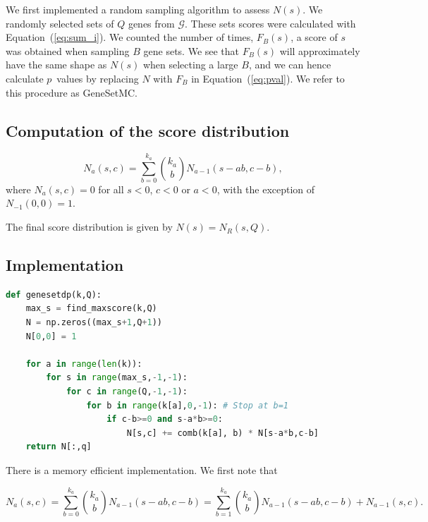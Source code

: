\documentclass[a4paper,american]{lipics-v2016}
\begin{document}
We first implemented a random sampling algorithm to assess $N(s)$. We randomly selected sets of $Q$ genes from $\mathcal{G}$. These sets scores were calculated with Equation~(\ref{eq:sum_i}). We counted the number of times, $F_B(s)$, a score of $s$ was obtained when sampling $B$ gene sets. We see that $F_B(s)$ will approximately have the same shape as $N(s)$ when selecting a large $B$, and we can hence calculate $p$~values by replacing $N$ with $F_B$ in Equation~(\ref{eq:pval}). We refer to this procedure as GeneSetMC.

\subsection*{Computation of the score distribution}

\begin{equation}
N_a(s,c)=\sum_{b=0}^{k_a}{k_a \choose b} N_{a-1}(s-ab,c-b),
\end{equation}
where $N_a(s,c)=0$ for all $s<0$, $c<0$ or $a<0$, with the exception of $N_{-1}(0,0)=1$.

The final score distribution is given by $N(s)=N_R(s,Q)$.

\subsection*{Implementation}

\begin{lstlisting}[language=Python, caption={ The central part of the dynamic programing algorithm for finding $N(s)$. The function takes the vector of links per gene, $k_a$, as well as the number of query genes, $Q$ as an input. The function depends on two additional functions {\tt find\_maxscore(k,Q)}, which calculates the maximal score a query of size $Q$ can obtain, and {\tt comb(a,b)}, which calculates $ a \choose b $.}, label=lst:gensetdp, captionpos=t, float, abovecaptionskip=-\medskipamount]
def genesetdp(k,Q):
    max_s = find_maxscore(k,Q)
    N = np.zeros((max_s+1,Q+1))
    N[0,0] = 1

    for a in range(len(k)):
        for s in range(max_s,-1,-1):
            for c in range(Q,-1,-1):
                for b in range(k[a],0,-1): # Stop at b=1
                    if c-b>=0 and s-a*b>=0:
                        N[s,c] += comb(k[a], b) * N[s-a*b,c-b]
    return N[:,q]
\end{lstlisting}
There is a memory efficient implementation. We first note that

\[
N_a(s,c)=\sum_{b=0}^{k_a}{k_a \choose b} N_{a-1}(s-ab,c-b)=\sum_{b=1}^{k_a}{k_a \choose b} N_{a-1}(s-ab,c-b) + N_{a-1}(s,c).
\]
\end{document}
